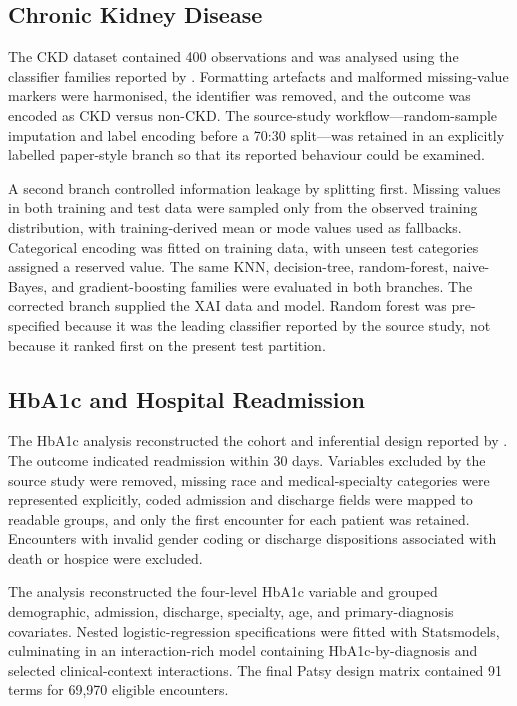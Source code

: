 \subsection{Chronic Kidney Disease}

The CKD dataset contained 400 observations and was analysed using the classifier families reported by \citet{santhiya_ckd_2024}. Formatting artefacts and malformed missing-value markers were harmonised, the identifier was removed, and the outcome was encoded as CKD versus non-CKD. The source-study workflow---random-sample imputation and label encoding before a 70:30 split---was retained in an explicitly labelled paper-style branch so that its reported behaviour could be examined.

A second branch controlled information leakage by splitting first. Missing values in both training and test data were sampled only from the observed training distribution, with training-derived mean or mode values used as fallbacks. Categorical encoding was fitted on training data, with unseen test categories assigned a reserved value. The same KNN, decision-tree, random-forest, naive-Bayes, and gradient-boosting families were evaluated in both branches. The corrected branch supplied the XAI data and model. Random forest was pre-specified because it was the leading classifier reported by the source study, not because it ranked first on the present test partition.

\subsection{HbA1c and Hospital Readmission}

The HbA1c analysis reconstructed the cohort and inferential design reported by \citet{strack_hba1c_2014}. The outcome indicated readmission within 30 days. Variables excluded by the source study were removed, missing race and medical-specialty categories were represented explicitly, coded admission and discharge fields were mapped to readable groups, and only the first encounter for each patient was retained. Encounters with invalid gender coding or discharge dispositions associated with death or hospice were excluded.

The analysis reconstructed the four-level HbA1c variable and grouped demographic, admission, discharge, specialty, age, and primary-diagnosis covariates. Nested logistic-regression specifications were fitted with Statsmodels, culminating in an interaction-rich model containing HbA1c-by-diagnosis and selected clinical-context interactions. The final Patsy design matrix contained 91 terms for 69,970 eligible encounters.

